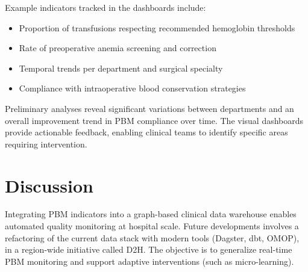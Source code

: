 \documentclass{IOS-Book-Article}
\begin{document}
Example indicators tracked in the dashboards include:

\begin{itemize}
\item Proportion of transfusions respecting recommended hemoglobin thresholds
\item Rate of preoperative anemia screening and correction
\item Temporal trends per department and surgical specialty
\item Compliance with intraoperative blood conservation strategies
\end{itemize}

Preliminary analyses reveal significant variations between departments and an overall improvement 
trend in PBM compliance over time. The visual dashboards provide actionable feedback, enabling clinical 
teams to identify specific areas requiring intervention.

\section{Discussion}

Integrating PBM indicators into a graph-based clinical data warehouse enables automated quality monitoring at 
hospital scale. Future developments involves a refactoring of the current data stack with modern tools (Dagster, dbt, OMOP), 
in a region-wide initiative called D2H. The objective is to generalize real-time PBM monitoring and 
support adaptive interventions (such as micro-learning).
\end{document}
